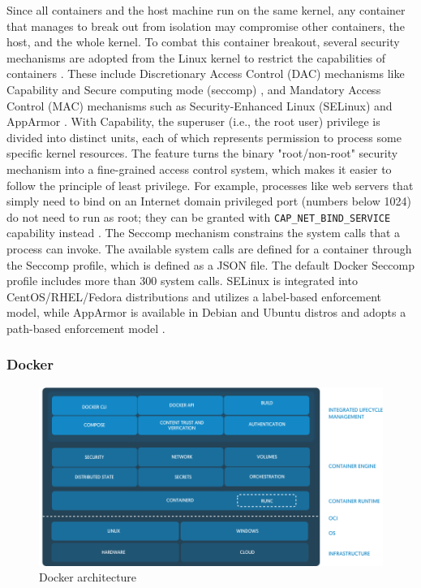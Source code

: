 \documentclass[english, 12pt, a4paper, sci, utf8, a-2b, online]{aaltothesis}
\begin{document}
Since all containers and the host machine run on the same kernel, any container that manages to break out from isolation may compromise other containers, the host, and the whole kernel.
To combat this container breakout, several security mechanisms are adopted from the Linux kernel to restrict the capabilities of containers \cite{lin2018measurement}.
These include Discretionary Access Control (DAC) mechanisms like Capability \cite{manpages-capabilities} and Secure computing mode (seccomp) \cite{manpages-seccomp}, and Mandatory Access Control (MAC) mechanisms such as Security-Enhanced Linux (SELinux) and AppArmor \cite{apparmor}.
With Capability, the superuser (i.e., the root user) privilege is divided into distinct units, each of which represents permission to process some specific kernel resources.
The feature turns the binary "root/non-root" security mechanism into a fine-grained access control system, which makes it easier to follow the principle of least privilege.
For example, processes like web servers that simply need to bind on an Internet domain privileged port (numbers below 1024) do not need to run as root; they can be granted with \lstinline{CAP_NET_BIND_SERVICE} capability instead \cite{docker-security}.
The Seccomp mechanism constrains the system calls that a process can invoke.
The available system calls are defined for a container through the Seccomp profile, which is defined as a JSON file.
The default Docker Seccomp profile \cite{docker-default-seccomp} includes more than 300 system calls.
SELinux is integrated into CentOS/RHEL/Fedora distributions and utilizes a label-based enforcement model, while AppArmor is available in Debian and Ubuntu distros and adopts a path-based enforcement model \cite{lin2018measurement}.

\subsubsection{Docker}

\begin{figure}[h!]
  \centering
  \includegraphics[width=\linewidth]{files/docker-arch.jpeg}
  \caption{Docker architecture \cite{containerd}}
  \label{figure-docker}
\end{figure}
\end{document}
